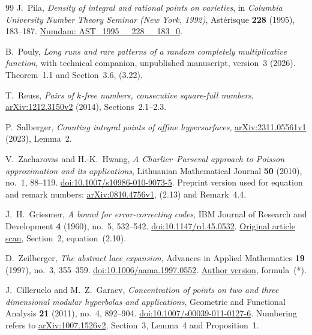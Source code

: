 \begin{thebibliography}{99}
J.~Pila,
\emph{Density of integral and rational points on varieties},
in \emph{Columbia University Number Theory Seminar
(New York, 1992)}, Ast\'erisque \textbf{228} (1995),
183--187.
\href{https://www.numdam.org/item/AST_1995__228__183_0/}
{Numdam: AST\_1995\_\_228\_\_183\_0}.

B.~Pouly,
\emph{Long runs and rare patterns of a random completely
multiplicative function}, with technical companion,
unpublished manuscript, version~3 (2026).
Theorem~1.1 and Section~3.6, (3.22).

T.~Reuss,
\emph{Pairs of \(k\)-free numbers, consecutive square-full
numbers},
\href{https://arxiv.org/abs/1212.3150v2}
{arXiv:1212.3150v2} (2014), Sections~2.1--2.3.

P.~Salberger,
\emph{Counting integral points of affine hypersurfaces},
\href{https://arxiv.org/abs/2311.05561v1}
{arXiv:2311.05561v1} (2023), Lemma~2.

V.~Zacharovas and H.-K.~Hwang,
\emph{A Charlier--Parseval approach to Poisson approximation
and its applications},
Lithuanian Mathematical Journal \textbf{50} (2010), no.~1,
88--119.
\href{https://doi.org/10.1007/s10986-010-9073-5}
{doi:10.1007/s10986-010-9073-5}.
Preprint version used for equation and remark numbers:
\href{https://arxiv.org/abs/0810.4756v1}
{arXiv:0810.4756v1}, (2.13) and Remark~4.4.

J.~H.~Griesmer,
\emph{A bound for error-correcting codes},
IBM Journal of Research and Development \textbf{4} (1960),
no.~5, 532--542.
\href{https://doi.org/10.1147/rd.45.0532}
{doi:10.1147/rd.45.0532}.
\href{https://bitsavers.trailing-edge.com/pdf/ibm/IBM_Journal_of_Research_and_Development/045/ibmrd0405M.pdf}
{Original article scan}, Section~2, equation~(2.10).

D.~Zeilberger,
\emph{The abstract lace expansion},
Advances in Applied Mathematics \textbf{19} (1997),
no.~3, 355--359.
\href{https://doi.org/10.1006/aama.1997.0552}
{doi:10.1006/aama.1997.0552}.
\href{https://sites.math.rutgers.edu/~zeilberg/mamarim/mamarimPDF/lace.pdf}
{Author version}, formula~(*).

J.~Cilleruelo and M.~Z.~Garaev,
\emph{Concentration of points on two and three dimensional
modular hyperbolas and applications},
Geometric and Functional Analysis \textbf{21} (2011),
no.~4, 892--904.
\href{https://doi.org/10.1007/s00039-011-0127-6}
{doi:10.1007/s00039-011-0127-6}.
Numbering refers to
\href{https://arxiv.org/abs/1007.1526v2}{arXiv:1007.1526v2},
Section~3, Lemma~4 and Proposition~1.


\end{thebibliography}
